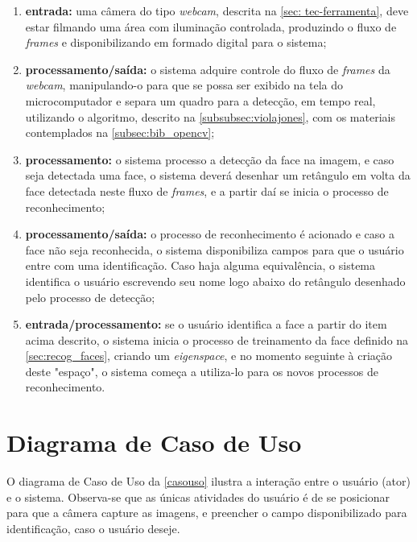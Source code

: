 \begin{enumerate}
	\item \textbf{entrada:} uma câmera do tipo \textit{webcam}, descrita na \autoref{sec: tec-ferramenta}, deve estar filmando uma área com iluminação controlada, produzindo o fluxo de \textit{frames} e disponibilizando em formado digital para o sistema;
	
	\item \textbf{processamento/saída:} o sistema adquire controle do fluxo de \textit{frames} da \textit{webcam}, manipulando-o para que se possa ser exibido na tela do microcomputador e separa um quadro para a detecção, em tempo real, utilizando o algoritmo, descrito na \autoref{subsubsec:violajones}, com os materiais contemplados na \autoref{subsec:bib_opencv};
	
	\item \textbf{processamento:} o sistema processo a detecção da face na imagem, e caso seja detectada uma face, o sistema deverá desenhar um retângulo em volta da face detectada neste fluxo de \textit{frames}, e a partir daí se inicia o processo de reconhecimento;
	
	\item \textbf{processamento/saída:} o processo de reconhecimento é acionado e caso a face não seja reconhecida, o sistema disponibiliza campos para que o usuário entre com uma identificação. Caso haja alguma equivalência, o sistema identifica o usuário escrevendo seu nome logo abaixo do retângulo desenhado pelo processo de detecção;
	
	\item \textbf{entrada/processamento:} se o usuário identifica a face a partir do item acima descrito, o sistema inicia o processo de treinamento da face definido na \autoref{sec:recog_faces}, criando um \textit{eigenspace}, e no momento seguinte à criação deste "espaço", o sistema começa a utiliza-lo para os novos processos de reconhecimento.
\end{enumerate}

\section{Diagrama de Caso de Uso}\label{sec:diagpacs}

O diagrama de Caso de Uso da \autoref{casouso} ilustra a interação entre o usuário (ator) e o sistema. Observa-se que as únicas atividades do usuário é de se posicionar para que a câmera capture as imagens, e preencher o campo disponibilizado para identificação, caso o usuário deseje.

